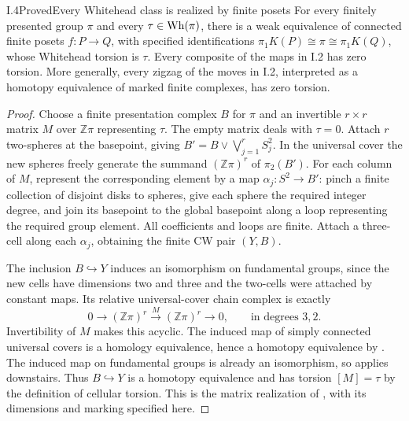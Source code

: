 \begin{claim}{I.4}{Proved}{Every Whitehead class is realized by finite posets}
For every finitely presented group $\pi$ and every
$\tau\in\operatorname{Wh}(\pi)$, there is a weak equivalence of connected finite
posets $f:P\to Q$, with specified identifications
$\pi_1K(P)\cong\pi\cong\pi_1K(Q)$, whose Whitehead torsion is $\tau$.
Every composite of the maps in I.2 has zero torsion. More generally,
every zigzag of the moves in I.2, interpreted as a homotopy equivalence
of marked finite complexes, has zero torsion.
\end{claim}
\begin{proof}
Choose a finite presentation complex $B$ for $\pi$ and an invertible
$r\times r$ matrix $M$ over $\mathbb Z\pi$ representing $\tau$.
The empty matrix deals with $\tau=0$. Attach $r$ two-spheres at the
basepoint, giving $B'=B\vee\bigvee_{j=1}^r S^2_j$.
In the universal cover the new spheres freely generate the summand
$(\mathbb Z\pi)^r$ of $\pi_2(B')$. For each column of $M$, represent
the corresponding element by a map $\alpha_j:S^2\to B'$:
pinch a finite collection of disjoint disks to spheres, give each
sphere the required integer degree, and join its basepoint to the
global basepoint along a loop representing the required group element.
All coefficients and loops are finite. Attach a three-cell along each
$\alpha_j$, obtaining the finite CW pair $(Y,B)$.

The inclusion $B\hookrightarrow Y$ induces an isomorphism on
fundamental groups, since the new cells have dimensions two and three
and the two-cells were attached by constant maps. Its relative
universal-cover chain complex is exactly
\[
 0\longrightarrow (\mathbb Z\pi)^r
   \xrightarrow{\ M\ }(\mathbb Z\pi)^r\longrightarrow0,
 \qquad\text{in degrees }3,2.
\]
Invertibility of $M$ makes this acyclic. The induced map of simply
connected universal covers is a homology equivalence, hence a homotopy
equivalence by \cite[Corollary~4.33]{I_Hatcher2002}. The induced
map on fundamental groups is already an isomorphism, so
\cite[Theorem~4.5]{I_Hatcher2002} applies downstairs.
Thus $B\hookrightarrow Y$ is a homotopy equivalence and has torsion
$[M]=\tau$ by the definition of cellular torsion.
This is the matrix realization of
\cite[Remark~6]{I_LurieWhiteheadII}, with its dimensions and
marking specified here.


\end{proof}
